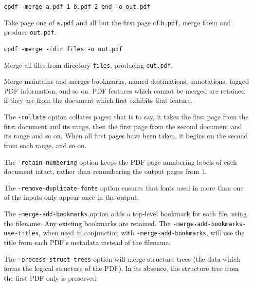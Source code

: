 \documentclass{book}
\begin{document}
  \begin{framed}\small
    \noindent\verb!cpdf -merge a.pdf 1 b.pdf 2-end -o out.pdf!

    \vspace{2.5mm}
    \noindent Take page one of \texttt{a.pdf} and all but the first page of
\texttt{b.pdf}, merge them and produce \texttt{out.pdf}.

    \vspace{1.5mm}
    \noindent\verb!cpdf -merge -idir files -o out.pdf!

    \vspace{2.5mm}
    \noindent Merge all files from directory \texttt{files}, producing \texttt{out.pdf}.

  \end{framed}

\noindent Merge maintains and merges bookmarks, named destinations, annotations, tagged PDF information, and so on. PDF features which cannot be merged are retained if they are from
the document which first exhibits that feature.

The \texttt{-collate} option collates pages: that is to say, it takes the first page from the first document and its range, then the first page from the second document and its range and so on. When all first pages have been taken, it begins on the second from each range, and so on.

The \texttt{-retain-numbering} option keeps the PDF page numbering labels of
each document intact, rather than renumbering the output pages from 1.

The \texttt{-remove-duplicate-fonts} option ensures that fonts used in more than one
of the inputs only appear once in the output.

The \texttt{-merge-add-bookmarks} option adds a top-level bookmark for each file, using the filename. Any existing bookmarks are retained. The \texttt{-merge\--add\--bookmarks\--use\--titles}, when used in conjunction with \texttt{-merge-add-bookmarks}, will use the title from each PDF's metadata instead of the filename.

The \texttt{-process-struct-trees} option will merge structure trees (the data which forms the logical structure of the PDF). In its absence, the structure tree from the first PDF only is preserved.
\end{document}
